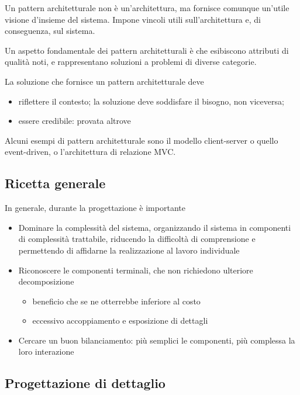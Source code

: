 \begin{itemize}
\begin{itemize}
Un pattern architetturale non è un'architettura, ma fornisce comunque un'utile
visione d'insieme del sistema. Impone vincoli utili sull'architettura e, di
conseguenza, sul sistema.

Un aspetto fondamentale dei pattern architetturali è che esibiscono attributi di
qualità noti, e rappresentano soluzioni a problemi di diverse categorie.

La soluzione che fornisce un pattern architetturale deve

\begin{itemize}
  \item riflettere il contesto; la soluzione deve soddisfare il bisogno, non
        viceversa;
  \item essere credibile: provata altrove
\end{itemize}

Alcuni esempi di pattern architetturale sono il modello client-server o quello
event-driven, o l'architettura di relazione MVC.


\subsection{Ricetta generale}

In generale, durante la progettazione è importante

\begin{itemize}
  \item Dominare la complessità del sistema, organizzando il sistema in
        componenti di complessità trattabile, riducendo la difficoltà di
        comprensione e permettendo di affidarne la realizzazione al lavoro
        individuale
  \item Riconoscere le componenti terminali, che non richiedono ulteriore
        decomposizione
    \begin{itemize}
      \item beneficio che se ne otterrebbe inferiore al costo
      \item eccessivo accoppiamento e esposizione di dettagli
    \end{itemize}
  \item Cercare un buon bilanciamento: più semplici le componenti, più complessa
        la loro interazione
\end{itemize}

\subsection{Progettazione di dettaglio}
\label{sub:progettazione_di_dettaglio}


\end{itemize}
\end{itemize}
